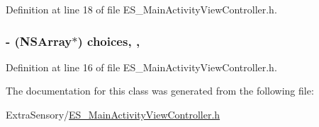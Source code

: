 Definition at line 18 of file E\+S\+\_\+\+Main\+Activity\+View\+Controller.\+h.

\hypertarget{interface_e_s___main_activity_view_controller_ae463b4929b18a7a51b4a6ecadf8e1e63}{
\subsubsection[{choices}]{\setlength{\rightskip}{0pt plus 5cm}-\/ (N\+S\+Array$\ast$) choices\hspace{0.3cm}{\ttfamily [read]}, {\ttfamily [write]}, {\ttfamily [atomic]}}}\label{interface_e_s___main_activity_view_controller_ae463b4929b18a7a51b4a6ecadf8e1e63}


Definition at line 16 of file E\+S\+\_\+\+Main\+Activity\+View\+Controller.\+h.



The documentation for this class was generated from the following file\+:\begin{DoxyCompactItemize}
\item 
Extra\+Sensory/\hyperlink{_e_s___main_activity_view_controller_8h}{E\+S\+\_\+\+Main\+Activity\+View\+Controller.\+h}\end{DoxyCompactItemize}
